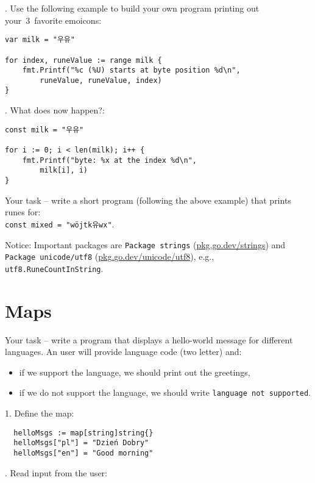 \documentclass[11pt, letterpaper]{article}
\begin{document}
. Use the following example to build your own program printing out your~3~favorite emoicons:

\begin{verbatim}
var milk = "우유"

for index, runeValue := range milk {
	fmt.Printf("%c (%U) starts at byte position %d\n",
		runeValue, runeValue, index)
}
\end{verbatim}

. What does now happen?:

\begin{verbatim}
const milk = "우유"

for i := 0; i < len(milk); i++ {
	fmt.Printf("byte: %x at the index %d\n",
		milk[i], i)
}
\end{verbatim}

Your task -- write a short program (following the above example) that prints runes for:\\ \texttt{const mixed = "wöjtk유wx"}.

\bigskip
Notice: Important packages are \verb|Package strings| (\href{https://pkg.go.dev/strings}{pkg.go.dev/strings}) and \verb|Package unicode/utf8| (\href{https://pkg.go.dev/unicode/utf8}{pkg.go.dev/unicode/utf8}), e.g., \texttt{utf8.RuneCountInString}.

\section{Maps}

Your task -- write a program that displays a hello-world message for different languages. An user will provide language code (two letter) and:\begin{itemize}
\item if we support the language, we should print out the greetings,
\item if we do not support the language, we should write \verb|language not supported|.
\end{itemize}

1. Define the map:

\begin{verbatim}
  helloMsgs := map[string]string{}
  helloMsgs["pl"] = "Dzień Dobry"
  helloMsgs["en"] = "Good morning"
\end{verbatim}

. Read input from the user:
\end{document}
